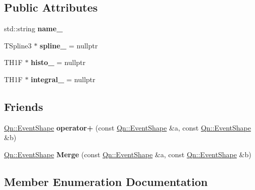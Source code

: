 \subsection*{Public Attributes}
\begin{DoxyCompactItemize}
\item 
\mbox{\label{classQn_1_1EventShape_a9391dd288a73ae2008fdf0668e8b78cb}} 
std\+::string {\bfseries name\+\_\+}
\item 
\mbox{\label{classQn_1_1EventShape_ab440a85cfe628204a36b4dd1bbcd0df3}} 
T\+Spline3 $\ast$ {\bfseries spline\+\_\+} = nullptr
\item 
\mbox{\label{classQn_1_1EventShape_aded33163b97cd9464e4a4823bd2e0aa2}} 
T\+H1F $\ast$ {\bfseries histo\+\_\+} = nullptr
\item 
\mbox{\label{classQn_1_1EventShape_a751746c6990b00fa5dd33c63685d32f7}} 
T\+H1F $\ast$ {\bfseries integral\+\_\+} = nullptr
\end{DoxyCompactItemize}
\subsection*{Friends}
\begin{DoxyCompactItemize}
\item 
\mbox{\label{classQn_1_1EventShape_a3a0a26221b1b247ef5256348a0fa2ec2}} 
\mbox{\hyperlink{classQn_1_1EventShape}{Qn\+::\+Event\+Shape}} {\bfseries operator+} (const \mbox{\hyperlink{classQn_1_1EventShape}{Qn\+::\+Event\+Shape}} \&a, const \mbox{\hyperlink{classQn_1_1EventShape}{Qn\+::\+Event\+Shape}} \&b)
\item 
\mbox{\label{classQn_1_1EventShape_a8026b1421bb3957d46d6d095a7fe3c8c}} 
\mbox{\hyperlink{classQn_1_1EventShape}{Qn\+::\+Event\+Shape}} {\bfseries Merge} (const \mbox{\hyperlink{classQn_1_1EventShape}{Qn\+::\+Event\+Shape}} \&a, const \mbox{\hyperlink{classQn_1_1EventShape}{Qn\+::\+Event\+Shape}} \&b)
\end{DoxyCompactItemize}


\subsection{Member Enumeration Documentation}
\mbox{\label{classQn_1_1EventShape_a5dce9f7b8a7fa7a8a663634ece8b7cb6}} 

